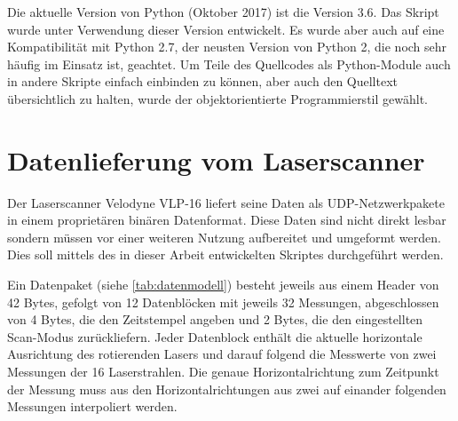 \documentclass[a4paper,12pt,bibliography=totoc, listof=totoc,titlepage,pointlessnumbers]{scrreprt}
\begin{document}
Die aktuelle Version von Python (Oktober 2017) ist die Version 3.6. Das Skript wurde unter Verwendung dieser Version entwickelt. Es wurde aber auch auf eine Kompatibilität mit Python 2.7, der neusten Version von Python 2, die noch sehr häufig im Einsatz ist, geachtet. Um Teile des Quellcodes als Python-Module auch in andere Skripte einfach einbinden zu können, aber auch den Quelltext übersichtlich zu halten, wurde der objektorientierte Programmierstil gewählt.

\section{Datenlieferung vom Laserscanner}
\label{ss:Datenlieferung}
Der Laserscanner Velodyne VLP-16 liefert seine Daten als UDP-Netzwerkpakete in einem proprietären binären Datenformat. Diese Daten sind nicht direkt lesbar sondern müssen vor einer weiteren Nutzung aufbereitet und umgeformt werden. Dies soll mittels des in dieser Arbeit entwickelten Skriptes durchgeführt werden.

Ein Datenpaket (siehe \autoref{tab:datenmodell}) besteht jeweils aus einem Header von 42 Bytes, gefolgt von 12 Datenblöcken mit jeweils 32 Messungen, abgeschlossen von 4 Bytes, die den Zeitstempel angeben und 2 Bytes, die den eingestellten Scan-Modus zurückliefern. Jeder Datenblock enthält die aktuelle horizontale Ausrichtung des rotierenden Lasers und darauf folgend die Messwerte von zwei Messungen der 16 Laserstrahlen. Die genaue Horizontalrichtung zum Zeitpunkt der Messung muss aus den Horizontalrichtungen aus zwei auf einander folgenden Messungen interpoliert werden.
\end{document}
